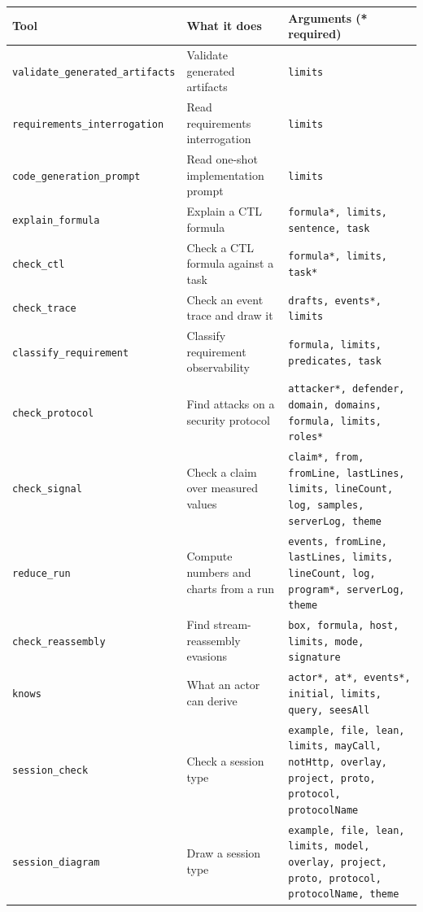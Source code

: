 {\footnotesize\begin{tabular}{@{}p{}p{}p{}@{}}
\toprule
Tool & What it does & Arguments (* required) \\
\midrule
\texttt{validate\_\allowbreak{}generated\_\allowbreak{}artifacts} & Validate generated artifacts & \texttt{limits} \\
\texttt{requirements\_\allowbreak{}interrogation} & Read requirements interrogation & \texttt{limits} \\
\texttt{code\_\allowbreak{}generation\_\allowbreak{}prompt} & Read one-shot implementation prompt & \texttt{limits} \\
\texttt{explain\_\allowbreak{}formula} & Explain a CTL formula & \texttt{formula*, limits, sentence, task} \\
\texttt{check\_\allowbreak{}ctl} & Check a CTL formula against a task & \texttt{formula*, limits, task*} \\
\texttt{check\_\allowbreak{}trace} & Check an event trace and draw it & \texttt{drafts, events*, limits} \\
\texttt{classify\_\allowbreak{}requirement} & Classify requirement observability & \texttt{formula, limits, predicates, task} \\
\texttt{check\_\allowbreak{}protocol} & Find attacks on a security protocol & \texttt{attacker*, defender, domain, domains, formula, limits, roles*} \\
\texttt{check\_\allowbreak{}signal} & Check a claim over measured values & \texttt{claim*, from, fromLine, lastLines, limits, lineCount, log, samples, serverLog, theme} \\
\texttt{reduce\_\allowbreak{}run} & Compute numbers and charts from a run & \texttt{events, fromLine, lastLines, limits, lineCount, log, program*, serverLog, theme} \\
\texttt{check\_\allowbreak{}reassembly} & Find stream-reassembly evasions & \texttt{box, formula, host, limits, mode, signature} \\
\texttt{knows} & What an actor can derive & \texttt{actor*, at*, events*, initial, limits, query, seesAll} \\
\texttt{session\_\allowbreak{}check} & Check a session type & \texttt{example, file, lean, limits, mayCall, notHttp, overlay, project, proto, protocol, protocolName} \\
\texttt{session\_\allowbreak{}diagram} & Draw a session type & \texttt{example, file, lean, limits, model, overlay, project, proto, protocol, protocolName, theme} \\

\end{tabular}}
